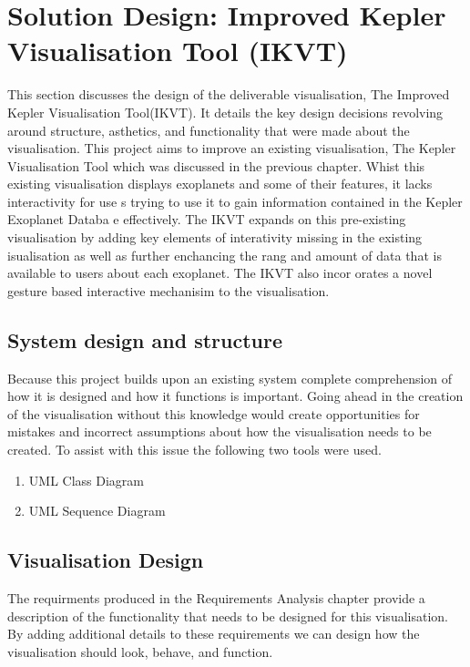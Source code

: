 \chapter{Solution Design: Improved Kepler Visualisation Tool (IKVT)}\label{C:sd}
This section discusses the design of the deliverable visualisation, The Improved
Kepler Visualisation Tool(IKVT). It details
the key design decisions revolving around structure, asthetics, and
functionality that were made about the visualisation. 
This project aims to improve an existing visualisation, The Kepler Visualisation
Tool which was discussed in the previous chapter. Whist this existing
visualisation displays exoplanets and some of their features, it lacks
interactivity for use s trying to use it to gain information contained in the
Kepler Exoplanet Databa e effectively. The IKVT expands on this pre-existing
visualisation by adding key elements of interativity missing in the existing
 isualisation as well as further enchancing the rang  and amount of data that is
available to users about each exoplanet. The IKVT also incor orates a novel
gesture based interactive mechanisim to the visualisation.


\section{System design and structure}
Because this project builds upon an existing system complete comprehension of how it is designed and how it functions is important. Going ahead in the creation of the visualisation without this knowledge would create opportunities for mistakes and incorrect assumptions about how the visualisation needs to be created. To assist with this issue the following two tools were used.

\begin{enumerate}
 \item UML Class Diagram
 
 
 \item UML Sequence Diagram
\end{enumerate}

\section{Visualisation Design}
The requirments produced in the Requirements Analysis chapter provide a
description of the functionality that needs to be designed for this
visualisation. By adding additional details to these requirements we can design
how the visualisation should look, behave, and function.
